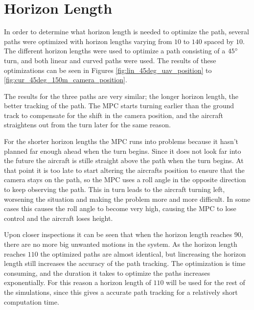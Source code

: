 \section{Horizon Length}

In order to determine what horizon length is needed to optimize the path, several paths were optimized with horizon lengths varying from $10$ to $140$ spaced by $10$. The different horizon lengths were used to optimize a path consisting of a $45\degree$ turn, and both linear and curved paths were used. The results of these optimizations can be seen in Figures \ref{fig:lin_45deg_uav_position} to \ref{fig:cur_45deg_150m_camera_position}.

The results for the three paths are very similar; the longer horizon length, the better tracking of the path. The MPC starts turning earlier than the ground track to compensate for the shift in the camera position, and the aircraft straightens out from the turn later for the same reason.

For the shorter horizon lengths the MPC runs into problems because it hasn't planned far enough ahead when the turn begins. Since it does not look far into the future the aircraft is stille straight above the path when the turn begins. At that point it is too late to start altering the aircrafts position to ensure that the camera stays on the path, so the MPC uses a roll angle in the opposite direction to keep observing the path. This in turn leads to the aircraft turning left, worsening the situation and making the problem more and more difficult. In some cases this causes the roll angle to become very high, causing the MPC to lose control and the aircraft loses height.

Upon closer inspections it can be seen that when the horizon length reaches $90$, there are no more big unwanted motions in the system. As the horizon length reaches $110$ the optimized paths are almost identical, but lincreasing the horizon length still increases the accuracy of the path tracking. The optimization is time consuming, and the duration it takes to optimize the paths increases exponentially. For this reason a horizon length of $110$ will be used for the rest of the simulations, since this gives a accurate path tracking for a relatively short computation time.

